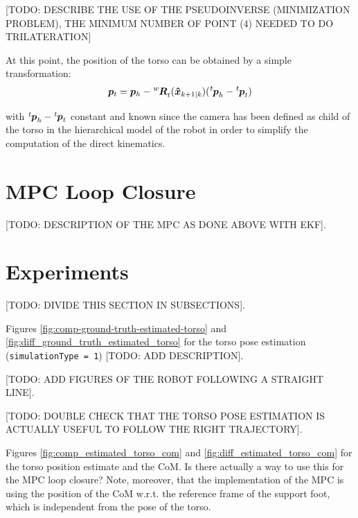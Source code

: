 \documentclass[a4paper]{article}
\begin{document}
[TODO: DESCRIBE THE USE OF THE
PSEUDOINVERSE (MINIMIZATION PROBLEM), THE MINIMUM NUMBER OF POINT (4) NEEDED TO DO TRILATERATION]

At this point, the position of the torso can be obtained by
a simple transformation:
\begin{equation}
    \bm{p}_t = \bm{p}_h - \tensor[^w]{\bm{R}}{_t}(\bm{\hat{x}}_{k+1|k}) (\tensor[^t]{\bm{p}}{_h} - \tensor[^t]{\bm{p}}{_t})
\end{equation}

\noindent with $\tensor[^t]{\bm{p}}{_h} - \tensor[^t]{\bm{p}}{_t}$
constant and known
since the camera has been defined as child of the torso in
the hierarchical model of the robot in order to simplify the
computation of the direct kinematics.

\section{MPC Loop Closure}
[TODO: DESCRIPTION OF THE MPC AS DONE ABOVE WITH EKF].

\section{Experiments}
[TODO: DIVIDE THIS SECTION IN SUBSECTIONS].

Figures \ref{fig:comp-ground-truth-estimated-torso} and
\ref{fig:diff_ground_truth_estimated_torso} for the
torso pose estimation (\texttt{simulationType = 1}) [TODO:
ADD DESCRIPTION].

[TODO: ADD FIGURES OF THE ROBOT FOLLOWING A STRAIGHT LINE].

[TODO: DOUBLE CHECK THAT THE TORSO POSE ESTIMATION IS
ACTUALLY USEFUL TO FOLLOW THE RIGHT TRAJECTORY].

Figures \ref{fig:comp_estimated_torso_com} and \ref{fig:diff_estimated_torso_com} for the torso position
estimate and the CoM. Is there actually a way to use this
for the MPC loop closure? Note, moreover, that the
implementation of the MPC is using the position of the
CoM w.r.t. the reference frame of the support foot, which
is independent from the pose of the torso.
\end{document}
